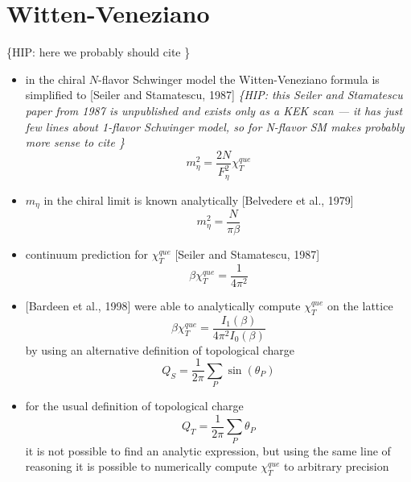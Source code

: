 \documentclass[a4paper,11pt]{article}
\begin{document}
\section{Witten-Veneziano}

\{HIP: here we probably should cite \cite{Witten1979, *Veneziano1979}\}

  \begin{itemize}
    \item in the chiral $N$-flavor Schwinger model the
      Witten-Veneziano formula is simplified to [Seiler and
      Stamatescu, 1987]\cite{Seiler1987}
      \textit{\{HIP: this Seiler and Stamatescu paper from 1987 is unpublished
        and exists only as a KEK scan --- it has just few lines 
        about 1-flavor Schwinger model, so for N-flavor SM makes 
        probably more sense to cite \cite{Gattringer1994}\}}
      \[
        m_\eta^2 = \frac{2N}{F_\eta^2}\chi_T^{que}
      \]
    \item $m_\eta$ in the chiral limit is known analytically
      [Belvedere et al., 1979]\cite{Belvedere1979}
      \[
        m_\eta^2 = \frac{N}{\pi\beta}
      \]
    \item continuum prediction for $\chi_T^{que}$
      [Seiler and Stamatescu, 1987]
      \[
        \beta\chi_T^{que} = \frac{1}{4\pi^2}
      \]
  \end{itemize}

  \begin{itemize}
    \item {} [Bardeen et al., 1998]\cite{Bardeen1998}
      were able to analytically
      compute $\chi_T^{que}$ on the lattice
      \[
        \beta\chi_T^{que} = \frac{I_1(\beta)}{4 \pi^2 I_0(\beta)}
      \]
      \setlength{\abovedisplayskip}{6pt}
      by using an alternative definition of topological charge
      \[
        Q_S = \frac{1}{2\pi}\sum_{P}\sin(\theta_P)
      \]
    \setlength{\belowdisplayskip}{4pt} 
    \item for the usual definition of topological charge
      \[
        Q_T = \frac{1}{2\pi}\sum_{P}\theta_P
      \] 
      it is not possible to find an analytic expression, but using the 
      same line of reasoning it is possible to numerically compute
      $\chi_T^{que}$ to arbitrary precision
  \end{itemize}
\end{document}
